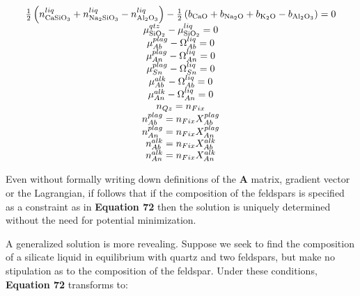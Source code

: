 \documentclass[11pt, titlepage, twoside]{article}
\begin{document}
\begin{MPEquation}[!ht]
\begin{equation}
\begin{array}{c}
\frac{1}{2}\left( {n_{{\rm{CaSi}}{{\rm{O}}_3}}^{liq} + n_{{\rm{N}}{{\rm{a}}_2}{\rm{Si}}{{\rm{O}}_3}}^{liq} - n_{{\rm{A}}{{\rm{l}}_2}{{\rm{O}}_3}}^{liq}} \right) - \frac{1}{2}\left( {{b_{{\rm{CaO}}}} + {b_{{\rm{N}}{{\rm{a}}_2}{\rm{O}}}} + {b_{{{\rm{K}}_2}{\rm{O}}}} - {b_{{\rm{A}}{{\rm{l}}_2}{{\rm{O}}_3}}}} \right) = 0\\
\mu _{{\rm{Si}}{{\rm{O}}_2}}^{qtz} - \mu _{{\rm{Si}}{{\rm{O}}_2}}^{liq} = 0\\
\mu _{Ab}^{plag} - {\Omega _{Ab}^{liq}} = 0\\
\mu _{An}^{plag} - {\Omega _{An}^{liq}} = 0\\
\mu _{Sn}^{plag} - {\Omega _{Sn}^{liq}} = 0\\
\mu _{Ab}^{alk} - {\Omega _{Ab}^{liq}} = 0\\
\mu _{An}^{alk} - {\Omega _{An}^{liq}} = 0\\
{n_{Qz}} = {n_{Fix}}\\
n_{Ab}^{plag} = {n_{Fix}}X_{Ab}^{plag}\\
n_{An}^{plag} = {n_{Fix}}X_{An}^{plag}\\
n_{Ab}^{alk} = {n_{Fix}}X_{Ab}^{alk}\\
n_{An}^{alk} = {n_{Fix}}X_{An}^{alk}
\end{array}
\end{equation}
\label{MPEquationElement:CC452263-DC28-43B0-D814-E610EC195889}
\end{MPEquation}
Even without formally writing down definitions of the \textbf{A} matrix, gradient vector or the Lagrangian, if follows that if the composition of the feldspars is specified as a constraint as in \textbf{Equation 72} then the solution is uniquely determined without the need for potential minimization.

A generalized solution is more revealing. Suppose we seek to find the composition of a silicate liquid in equilibrium with quartz and two feldspars, but make no stipulation as to the composition of the feldspar. Under these conditions, \textbf{Equation 72} transforms to:
\end{document}
